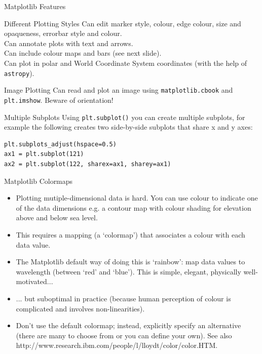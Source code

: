 \documentclass{beamer}
\begin{document}
\begin{frame}[fragile]{Matplotlib Features}
  \fontsize{11pt}{11}\selectfont
  \begin{block}{Different Plotting Styles}
     Can edit marker style, colour, edge colour, size and opaqueness, errorbar style and colour. \\
     Can annotate plots with text and arrows. \\
     Can include colour maps and bars (see next slide). \\
     Can plot in polar and World Coordinate System coordinates (with the help of \texttt{astropy}).
  \end{block}
  \begin{block}{Image Plotting}
     Can read and plot an image using \texttt{matplotlib.cbook} and \texttt{plt.imshow}. Beware of orientation!
  \end{block}
  \begin{block}{Multiple Subplots}
     Using \texttt{plt.subplot()} you can create multiple subplots, for example the following creates two side-by-side subplots that share x and y axes:\\
     \begin{lstlisting}
plt.subplots_adjust(hspace=0.5)
ax1 = plt.subplot(121)
ax2 = plt.subplot(122, sharex=ax1, sharey=ax1)
     \end{lstlisting}
  \end{block}
\end{frame}

\begin{frame}{Matplotlib Colormaps}
  \begin{itemize}
    \item Plotting mutiple-dimensional data is hard. You can use colour to indicate one of the data dimensions e.g. a contour map with colour shading for elevation above and below sea level.
    \item This requires a mapping (a `colormap') that associates a colour with each data value.
    \item The Matplotlib default way of doing this is `rainbow': map data values to wavelength (between `red' and `blue'). This is simple, elegant, physically well-motivated...
    \item ... but suboptimal in practice (because human perception of colour is complicated and involves non-linearities).
    \item Don't use the default colormap; instead, explicitly specify an alternative (there are many to choose from or you can define your own). See also http://www.research.ibm.com/people/l/lloydt/color/color.HTM.
  \end{itemize}

\end{frame}
\end{document}
